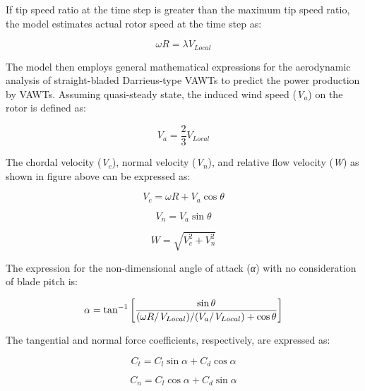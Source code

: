 If tip speed ratio at the time step is greater than the maximum tip speed ratio, the model estimates actual rotor speed at the time step as:

\begin{equation}
\omega R = \lambda {V_{Local}}
\end{equation}

The model then employs general mathematical expressions for the aerodynamic analysis of straight-bladed Darrieus-type VAWTs to predict the power production by VAWTs. Assuming quasi-steady state, the induced wind speed (\emph{V\(_{a}\)}) on the rotor is defined as:

\begin{equation}
{V_a} = \frac{2}{3}{V_{Local}}
\end{equation}

The chordal velocity (\emph{V\(_{c}\)}), normal velocity (\emph{V\(_{n}\)}), and relative flow velocity (\emph{W}) as shown in figure above can be expressed as:

\begin{equation}
{V_c} = \omega R + {V_a}\cos \theta
\end{equation}

\begin{equation}
{V_n} = {V_a}\sin \theta
\end{equation}

\begin{equation}
W = \sqrt {V_c^2 + V_n^2}
\end{equation}

The expression for the non-dimensional angle of attack (\emph{α}) with no consideration of blade pitch is:

\begin{equation}
\alpha  = {\tan ^{ - 1}}\left[ {\frac{{\sin \theta }}{{{{(\omega R} \mathord{\left/ {\vphantom {{(\omega R} {{V_{Local}})/({{{V_a}} \mathord{\left/ {\vphantom {{{V_a}} {{V_{Local}}}}} \right. } {{V_{Local}}}}}}} \right. } {{V_{Local}})/({{{V_a}} \mathord{\left/ {\vphantom {{{V_a}} {{V_{Local}}}}} \right. } {{V_{Local}}}}}}) + \cos \theta }}} \right]
\end{equation}

The tangential and normal force coefficients, respectively, are expressed as:

\begin{equation}
{C_t} = {C_l}\sin \alpha  + {C_d}\cos \alpha
\end{equation}

\begin{equation}
{C_n} = {C_l}\cos \alpha  + {C_d}\sin \alpha
\end{equation}

